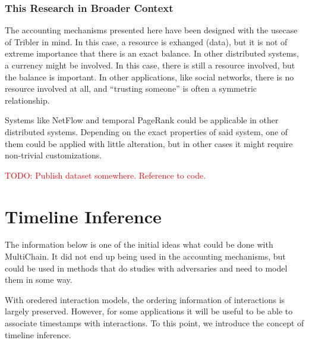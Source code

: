 \documentclass[a4paper,11pt]{book}
\newcommand\musthave[1]{\textcolor{red}{TODO: #1}}
\theoremstyle{definition}
\begin{document}
\subsection{This Research in Broader Context}
The accounting mechanisms presented here have been designed with the usecase of
Tribler in mind. In this case, a resource is exhanged (data), but it is not of extreme
importance that there is an exact balance. In other distributed systems, a currency
might be involved. In this case, there is still a resource involved, but the balance
is important. In other applications, like social networks, there is no resource involved
at all, and ``trusting someone'' is often a symmetric relationship. 

Systems like NetFlow and temporal PageRank could be applicable in other distributed
systems. Depending on the exact properties of said system, one of them could be
applied with little alteration, but in other cases it might require non-trivial
customizations.


\musthave{Publish dataset somewhere. Reference to code.}










\appendix

\chapter{Timeline Inference}

The information below is one of the initial ideas what could be done with MultiChain. It did not end up being
used in the accounting mechanisms, but could be used in methods that do studies with adversaries and need
to model them in some way.
    
With oredered interaction models, the ordering information of interactions is largely preserved. However, for some
applications it will be useful to be able to associate timestamps with interactions. To
this point, we introduce the concept of timeline inference.
\end{document}
